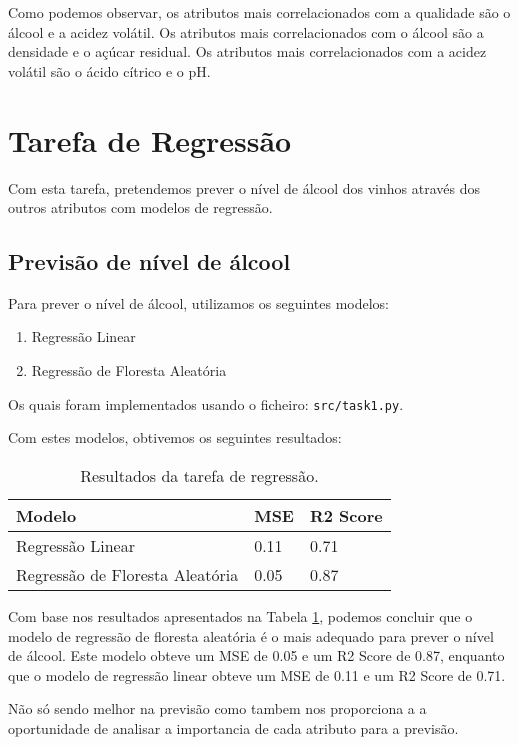 \documentclass{article}
\begin{document}
Como podemos observar, os atributos mais correlacionados com a qualidade são o álcool e a acidez volátil. Os atributos mais correlacionados com o álcool são a densidade e o açúcar residual. Os atributos mais correlacionados com a acidez volátil são o ácido cítrico e o pH.

\section{Tarefa de Regressão}

Com esta tarefa, pretendemos prever o nível de álcool dos vinhos através dos outros atributos com modelos de regressão.

\subsection{Previsão de nível de álcool}
Para prever o nível de álcool, utilizamos os seguintes modelos:

\begin{enumerate}
  \item Regressão Linear
  \item Regressão de Floresta Aleatória
\end{enumerate}

Os quais foram implementados usando o ficheiro: \texttt{src/task1.py}.

Com estes modelos, obtivemos os seguintes resultados:

\begin{table}[ht]
  \centering
  \begin{tabular}{@{}lll@{}}
    \toprule
    Modelo & MSE & R2 Score \\ \midrule
    Regressão Linear & 0.11 & 0.71 \\
    Regressão de Floresta Aleatória & 0.05 & 0.87 \\ \bottomrule
  \end{tabular}
  \caption{Resultados da tarefa de regressão.}
  \label{tab:task1_results}
\end{table}

Com base nos resultados apresentados na Tabela \ref{tab:task1_results}, podemos concluir que o modelo de regressão de floresta aleatória é o mais adequado para prever o nível de álcool. Este modelo obteve um MSE de 0.05 e um R2 Score de 0.87, enquanto que o modelo de regressão linear obteve um MSE de 0.11 e um R2 Score de 0.71.

Não só sendo melhor na previsão como tambem nos proporciona a a oportunidade de analisar a importancia de cada atributo para a previsão.
\end{document}
